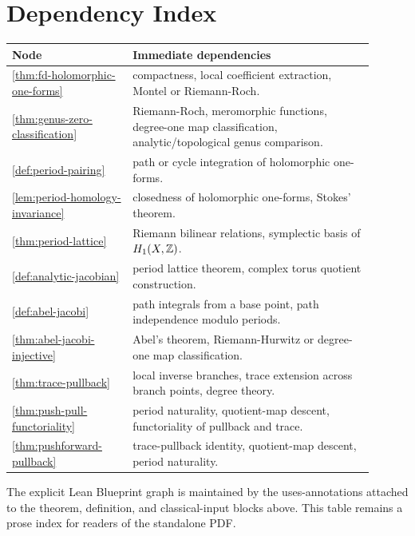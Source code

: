 \section{Dependency Index}
\label{sec:dependency-index}

\begin{center}
\begin{tabular}{p{0.30\linewidth}p{0.60\linewidth}}
\textbf{Node} & \textbf{Immediate dependencies} \\
\hline
\ref{thm:fd-holomorphic-one-forms} &
compactness, local coefficient extraction, Montel or Riemann-Roch. \\
\ref{thm:genus-zero-classification} &
Riemann-Roch, meromorphic functions, degree-one map classification,
analytic/topological genus comparison. \\
\ref{def:period-pairing} &
path or cycle integration of holomorphic one-forms. \\
\ref{lem:period-homology-invariance} &
closedness of holomorphic one-forms, Stokes' theorem. \\
\ref{thm:period-lattice} &
Riemann bilinear relations, symplectic basis of \(H_1(X,\mathbb{Z})\). \\
\ref{def:analytic-jacobian} &
period lattice theorem, complex torus quotient construction. \\
\ref{def:abel-jacobi} &
path integrals from a base point, path independence modulo periods. \\
\ref{thm:abel-jacobi-injective} &
Abel's theorem, Riemann-Hurwitz or degree-one map classification. \\
\ref{thm:trace-pullback} &
local inverse branches, trace extension across branch points, degree theory. \\
\ref{thm:push-pull-functoriality} &
period naturality, quotient-map descent, functoriality of pullback and trace. \\
\ref{thm:pushforward-pullback} &
trace-pullback identity, quotient-map descent, period naturality. \\
\end{tabular}
\end{center}

The explicit Lean Blueprint graph is maintained by the uses-annotations
attached to the theorem, definition, and classical-input blocks above. This
table remains a prose index for readers of the standalone PDF.
